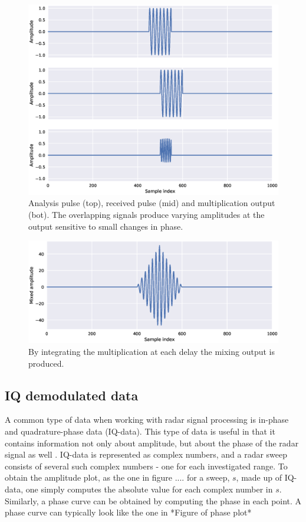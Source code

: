 \begin{figure}[h]
	\centering
	\includegraphics[scale=0.5]{figs_temp/mixing1}
	\caption{Analysis pulse (top), received pulse (mid) and multiplication output (bot). The overlapping signals produce varying amplitudes at the output sensitive to small changes in phase.}
	\label{fig:mix1}
\end{figure}

\begin{figure}[h]
	\centering
	\includegraphics[scale=0.5]{figs_temp/mixing2}
	\caption{By integrating the multiplication at each delay the mixing output is produced.}
	\label{fig:mix2}
\end{figure}



\subsection{IQ demodulated data}
A common type of data when working with radar signal processing is in-phase and quadrature-phase data (IQ-data).  This type of data is useful in that it contains information not only about amplitude, but about the phase of the radar signal as well \citep{richards_2014}. IQ-data is represented as complex numbers, and a radar sweep consists of several such complex numbers - one for each investigated range. To obtain the amplitude plot, as the one in figure .... for a sweep, $s$, made up of IQ-data, one simply computes the absolute value for each complex number in $s$. Similarly, a phase curve can be obtained by computing the phase in each point. A phase curve can typically look like the one in *Figure of phase plot*

